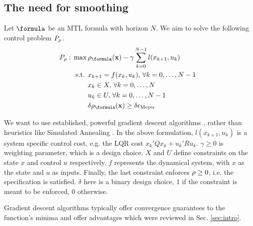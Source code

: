 \subsection{The need for smoothing}
\label{sec:need for smoothing}
Let $\formula$ be an MTL formula with horizon $N$.
We aim to solve the following control problem $P_\rho$.
\begin{subequations}
\label{eq:general_ctrl}
\begin{align}
P_\rob:\, \max\, & \rob_{\formula}(\sstraj) - \gamma \sum_{k=0}^{N-1} l(x_{k+1},u_{k}) \label{eq:general ctrl obj}\\
\text{s.t. } & x_{k+1} = f(x_k,u_k), \, \forall k=0,\dotsc,N-1 \label{eq:general ctrl dyn}\\
 & x_k \in X, \, \forall k=0,\dotsc,N \label{eq:general ctrl X}\\
 & u_k \in U, \, \forall k=0,\dotsc,N-1 \label{eq:general ctrl U}\\
 & \delta \rob_{\formula}(\sstraj) \geq \delta \epsilon_{\text{Meyer}} \label{eq:general ctrl pos rob}
\end{align}
\end{subequations}

We want to use established, powerful gradient descent algorithms \cite{Polak97_Optim}, rather than heuristics like Simulated Annealing \cite{kirkpatrickV_SA83}. 
In the above formulation, $l(x_{k+1},u_{k})$ is a system specific control cost, e.g. the LQR cost $x_k'Qx_k + u_k'Ru_k$. $\gamma \geq 0$ is weighting parameter, which is a design choice. $X$ and $U$ define constraints on the state $x$ and control $u$ respectively. $f$ represents the dynamical system, with $x$ as the state and $u$ as inputs. Finally, the last constraint enforces $\rho \geq 0$, i.e. the specification is satisfied. 
$\delta$ here is a binary design choice, $1$ if the constraint is meant to be enforced, $0$ otherwise.

Gradient descent algorithms typically offer convergence guarantees to the function's minima and offer advantages which were reviewed in Sec. \ref{sec:intro}.

